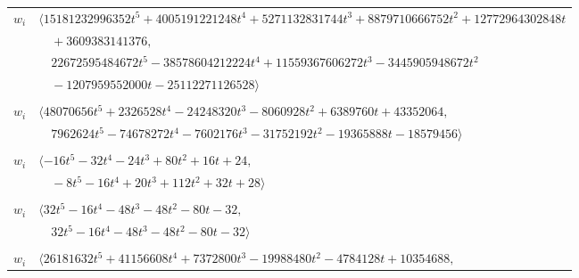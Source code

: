 \documentclass[11pt]{article}
\begin{document}
\begin{longtable}{@{}ll@{}}
$w_i$ & $\langle 15181232996352t^{5}+4005191221248t^{4}+5271132831744t^{3}+8879710666752t^{2}+12772964302848t$\\
 & $\quad +3609383141376,$\\
 & $\quad 22672595484672t^{5}-38578604212224t^{4}+11559367606272t^{3}-3445905948672t^{2}$\\
 & $\quad -1207959552000t-25112271126528\rangle$\\
\addlinespace[2pt]
\multicolumn{2}{@{}p{0.97\textwidth}@{}}{$i=42$, $D_i=32768$, $\rho_{ij}$: $14{:}2, \allowbreak 15{:}2, \allowbreak 19{:}1, \allowbreak 24{:}1, \allowbreak 26{:}1, \allowbreak 30{:}2, \allowbreak 33{:}2, \allowbreak 41{:}2, \allowbreak 48{:}2, \allowbreak 56{:}2, \allowbreak 58{:}2, \allowbreak 59{:}1, \allowbreak 61{:}2$}\\
$w_i$ & $\langle 48070656t^{5}+2326528t^{4}-24248320t^{3}-8060928t^{2}+6389760t+43352064,$\\
 & $\quad 7962624t^{5}-74678272t^{4}-7602176t^{3}-31752192t^{2}-19365888t-18579456\rangle$\\
\addlinespace[2pt]
\multicolumn{2}{@{}p{0.97\textwidth}@{}}{$i=43$, $D_i=4$, $\rho_{ij}$: $0{:}1, \allowbreak 2{:}2, \allowbreak 3{:}1, \allowbreak 14{:}1, \allowbreak 25{:}2, \allowbreak 39{:}2, \allowbreak 45{:}2, \allowbreak 47{:}2, \allowbreak 52{:}1, \allowbreak 62{:}1$}\\
$w_i$ & $\langle -16t^{5}-32t^{4}-24t^{3}+80t^{2}+16t+24,$\\
 & $\quad -8t^{5}-16t^{4}+20t^{3}+112t^{2}+32t+28\rangle$\\
\addlinespace[2pt]
\multicolumn{2}{@{}p{0.97\textwidth}@{}}{$i=44$, $D_i=16$, $\rho_{ij}$: $12{:}2, \allowbreak 22{:}1, \allowbreak 24{:}1, \allowbreak 26{:}1, \allowbreak 41{:}1, \allowbreak 51{:}2, \allowbreak 53{:}1, \allowbreak 63{:}2$}\\
$w_i$ & $\langle 32t^{5}-16t^{4}-48t^{3}-48t^{2}-80t-32,$\\
 & $\quad 32t^{5}-16t^{4}-48t^{3}-48t^{2}-80t-32\rangle$\\
\addlinespace[2pt]
\multicolumn{2}{@{}p{0.97\textwidth}@{}}{$i=45$, $D_i=32768$, $\rho_{ij}$: $1{:}2, \allowbreak 3{:}2, \allowbreak 12{:}1, \allowbreak 15{:}1, \allowbreak 18{:}1, \allowbreak 19{:}2, \allowbreak 24{:}2, \allowbreak 25{:}2, \allowbreak 31{:}2, \allowbreak 43{:}1, \allowbreak 46{:}2, \allowbreak 48{:}1, \allowbreak 55{:}2, \allowbreak 61{:}1, \allowbreak 65{:}1$}\\
$w_i$ & $\langle 26181632t^{5}+41156608t^{4}+7372800t^{3}-19988480t^{2}-4784128t+10354688,$\\

\end{longtable}
\end{document}
